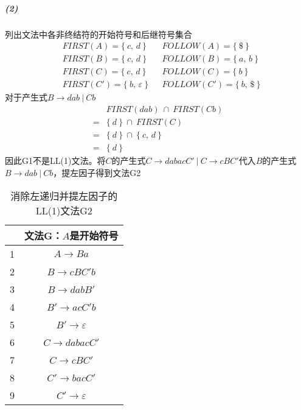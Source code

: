 \documentclass{article}
\begin{document}
\subparagraph{(2)}
列出文法中各非终结符的开始符号和后继符号集合
\begin{align*}
    &FIRST(A) = \big\{\  c,\,d \ \big\} &&FOLLOW(A) = \big\{\  \texttt{\$} \ \big\} \\
    &FIRST(B) = \big\{\  c,\,d \ \big\} &&FOLLOW(B) = \big\{\  a,\,b \ \big\} \\
    &FIRST(C) = \big\{\  c,\,d \ \big\} &&FOLLOW(C) = \big\{\  b \ \big\} \\
    &FIRST(C') = \big\{\  b,\,\varepsilon \ \big\} &&FOLLOW(C') = \big\{\  b,\,\texttt{\$} \ \big\}
\end{align*}
对于产生式$B \rightarrow dab\ |\ Cb$
\begin{align*}
    &FIRST(dab) \ \cap \  FIRST(Cb) \\
    =& \big\{\ d\ \big\} \ \cap \  FIRST(C) \\
    =& \big\{\ d\ \big\} \ \cap \  \big\{\ c,\,d\ \big\} \\
    =& \big\{\ d\ \big\}
\end{align*}
因此G1不是LL(1)文法。将$C$的产生式$C \rightarrow dabacC'\ |\ C \rightarrow cBC'$代入$B$的产生式$B \rightarrow dab\ |\ Cb$，提左因子得到文法G2
\begin{table}[H]
    \centering
    \caption{消除左递归并提左因子的LL(1)文法G2}
    \label{table:3}
    \begin{tabular}{|c|c|}
        \hline
        & 文法G：$A$是开始符号 \\ \hline
        1 & $A \rightarrow Ba$ \\ \hline
        2 & $B \rightarrow cBC'b$ \\ \hline
        3 & $B \rightarrow dabB'$ \\ \hline
        4 & $B' \rightarrow acC'b$ \\ \hline
        5 & $B' \rightarrow \varepsilon$ \\ \hline
        6 & $C \rightarrow dabacC'$ \\ \hline
        7 & $C \rightarrow cBC'$ \\ \hline
        8 & $C' \rightarrow bacC'$ \\ \hline
        9 & $C' \rightarrow \varepsilon$ \\ \hline
    \end{tabular}
\end{table}
\end{document}
